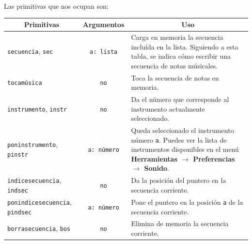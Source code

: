 Las primitivas que nos ocupan son:
\begin{center} \begin{longtable}{|m{3.3cm}|c|m{9cm}|} \hline 
   \multicolumn{1}{|c|}{\textbf{Primitivas}} & 
      \multicolumn{1}{c|}{\textbf{Argumentos}} &
         \multicolumn{1}{c|}{\textbf{Uso}} \\ \endhead \hline 
   \texttt{secuencia}, \index{secuencia@\texttt{secuencia}}
      \texttt{sec} \index{sec@\texttt{sec}} & \texttt{a: lista} &
         Carga en memoria la secuencia inclu\'ida en la lista. Siguiendo a
         esta tabla, se indica c\'omo escribir una secuencia de notas
         m\'usicales. \\ \hline 
   \texttt{tocam\'usica} \index{tocam\'usica@\texttt{tocam\'usica}} & \texttt{no} &
         Toca la secuencia de notas en memoria.\\ \hline 
   \texttt{instrumento}, \index{instrumento@\texttt{instrumento}}
      \texttt{instr} \index{instr@\texttt{instr}} & \texttt{no} &
        Da el n\'umero que corresponde al instrumento actualmente seleccionado.
                        \\ \hline 
   \texttt{poninstrumento}, \index{poninstrumento@\texttt{poninstrumento}}
     \texttt{pinstr} \index{pinstr@\texttt{pinstr}} & \texttt{a: n\'umero} &
        Queda seleccionado el instrumento n\'umero \texttt{a}. Puedes ver la
        lista de instrumentos disponibles en el men\'u 
        \textbf{Herramientas $\rightarrow$ Preferencias $\rightarrow$ Sonido}.\\ \hline 
   \texttt{indicesecuencia}, \index{indicesecuencia@\texttt{indicesecuencia}}
      \texttt{indsec} \index{indsec@\texttt{indsec}} & \texttt{no} &
        Da la posici\'on del puntero en la secuencia corriente.\\ \hline 
   \texttt{ponindicesecuencia},
      \index{ponindicesecuencia@\texttt{ponindicesecuencia}}
      \texttt{pindsec} \index{pindsec@\texttt{pindsec}} & 
        \texttt{a: n\'umero}&
        Pone el puntero en la posici\'on \texttt{a} de la secuencia corriente.
                        \\ \hline 
   \texttt{borrasecuencia}, \index{borrasecuencia@\texttt{borrasecuencia}}
     \texttt{bos} \index{bos@\texttt{bos}} & \texttt{no} &
        Elimina de memoria la secuencia corriente.\\ \hline
\end{longtable} \end{center}

